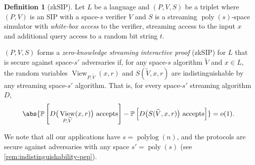 \documentclass[10pt,a4paper]{article}
\theoremstyle{definition}
\newtheorem{definition}[theorem]{Definition}
\newcommand{\zksip}{\textrm{zkSIP}}
\DeclareMathOperator{\view}{View}
\renewcommand{\P}{\mathbb P}
\newcommand{\poly}{\operatorname{poly}}
\newcommand{\polylog}{\operatorname{polylog}}
\begin{document}
\begin{definition}[zkSIP]
\label{def:streaming-zk}
    Let $L$ be a language and $(P,V,S)$ be a triplet where $(P,V)$ is an SIP with a space-$s$ verifier $V$ and $S$ is a streaming $\poly(s)$-space simulator with \emph{white-box access} to the verifier, streaming access to the input $x$ and additional query access to a random bit string $t$.
    
    $(P,V,S)$ forms a \emph{zero-knowledge streaming interactive proof} (\zksip{}) for $L$ that is secure against space-$s'$ adversaries if, for any space-$s$ algorithm $\widetilde V$ and $x\in L$, the random variables $\view_{P,\widetilde V}(x, r)$ and $S(\widetilde V, x, r)$ are indistinguishable by any streaming space-$s'$ algorithm. That is, for every space-$s'$ streaming algorithm $D$,
    \begin{equation*}
        \abs{\P\left[D\big(\view_{P,\widetilde V}(x, r)\big) \text{ accepts}\right] - \P\left[D\big(S(\widetilde V, x, r)\big) \text{ accepts}\right]} = o(1).
    \end{equation*}
\end{definition}

We note that all our applications have $s = \polylog(n)$, and the protocols are secure against adversaries with any space $s' = \poly(s)$ (see \cref{rem:indistinguishability-pep}).
\end{document}
